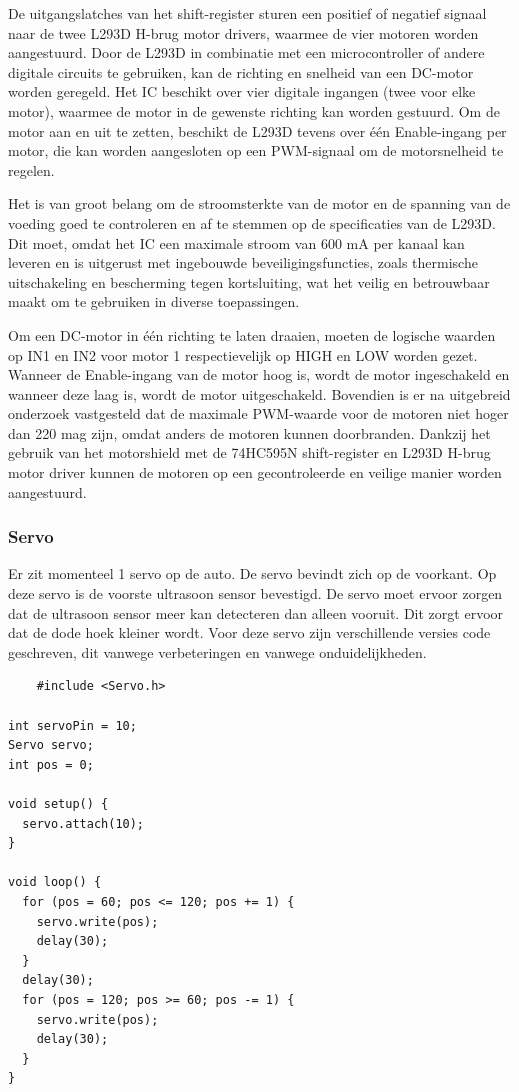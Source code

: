 De uitgangslatches van het \gls{shift-register} sturen een positief of negatief signaal naar de twee \gls{L293D} \gls{H-brug} motor drivers, waarmee de vier motoren worden aangestuurd. Door de \gls{L293D} in combinatie met een \gls{microcontroller} of andere digitale circuits te gebruiken, kan de richting en snelheid van een DC-motor worden geregeld. Het IC beschikt over vier digitale ingangen (twee voor elke motor), waarmee de motor in de gewenste richting kan worden gestuurd. Om de motor aan en uit te zetten, beschikt de \gls{L293D} tevens over één Enable-ingang per motor, die kan worden aangesloten op een \gls{PWM}-signaal om de motorsnelheid te regelen.

Het is van groot belang om de stroomsterkte van de motor en de spanning van de voeding goed te controleren en af te stemmen op de specificaties van de \gls{L293D}. Dit moet, omdat het IC een maximale stroom van 600 mA per kanaal kan leveren en is uitgerust met ingebouwde beveiligingsfuncties, zoals \gls{thermische} uitschakeling en bescherming tegen kortsluiting, wat het veilig en betrouwbaar maakt om te gebruiken in diverse toepassingen.

Om een DC-motor in één richting te laten draaien, moeten de logische waarden op IN1 en IN2 voor motor 1 respectievelijk op HIGH en LOW worden gezet. Wanneer de Enable-ingang van de motor hoog is, wordt de motor ingeschakeld en wanneer deze laag is, wordt de motor uitgeschakeld. Bovendien is er na uitgebreid onderzoek vastgesteld dat de maximale \gls{PWM}-waarde voor de motoren niet hoger dan 220 mag zijn, omdat anders de motoren kunnen doorbranden. Dankzij het gebruik van het \gls{motorshield} met de \gls{74HC595N} \gls{shift-register} en \gls{L293D} \gls{H-brug} motor driver kunnen de motoren op een gecontroleerde en veilige manier worden aangestuurd.

\subsubsection{Servo}
Er zit momenteel 1 servo op de auto. De servo bevindt zich op de voorkant. Op deze servo is de voorste ultrasoon sensor bevestigd. De servo moet ervoor zorgen dat de ultrasoon sensor meer kan detecteren dan alleen vooruit. Dit zorgt ervoor dat de dode hoek kleiner wordt. Voor deze servo zijn verschillende versies code geschreven, dit vanwege verbeteringen en vanwege onduidelijkheden. 

\begin{lstlisting}
    #include <Servo.h>

int servoPin = 10;
Servo servo;
int pos = 0;   

void setup() {
  servo.attach(10); 
}

void loop() {
  for (pos = 60; pos <= 120; pos += 1) { 
    servo.write(pos);              
    delay(30);                      
  }
  delay(30);
  for (pos = 120; pos >= 60; pos -= 1) {
    servo.write(pos);              
    delay(30);                       
  }
}
\end{lstlisting}

